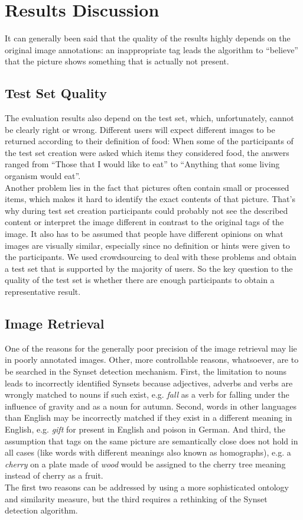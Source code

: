 %
\section{Results Discussion}
\label{sec_discussion}

It can generally been said that the quality of the results highly depends on the original image annotations: an inappropriate tag leads the algorithm to ``believe'' that the picture shows something that is actually not present.

\subsection{Test Set Quality}
The evaluation results also depend on the test set, which, unfortunately, cannot be clearly right or wrong. Different users will expect different images to be returned according to their definition of food: When some of the participants of the test set creation were asked which items they considered food, the answers ranged from ``Those that I would like to eat'' to ``Anything that some living organism would eat''. \\
Another problem lies in the fact that pictures often contain small or processed items, which makes it hard to identify the exact contents of that picture. That's why during test set creation participants could probably not see the described content or interpret the image different in contrast to the original tags of the image. 
It also has to be assumed that people have different opinions on what images are visually similar, especially since no definition or hints were given to the participants. We used crowdsourcing to deal with these problems and obtain a test set that is supported by the majority of users. So the key question to the quality of the test set is whether there are enough participants to obtain a representative result.

\subsection{Image Retrieval}
One of the reasons for the generally poor precision of the image retrieval may lie in poorly annotated images.
Other, more controllable reasons, whatsoever, are to be searched in the Synset detection mechanism.
First, the limitation to nouns leads to incorrectly identified Synsets because adjectives, adverbs and verbs are wrongly matched to nouns if such exist, e.g. \emph{fall} as a verb for falling under the influence of gravity and as a noun for autumn. 
Second, words in other languages than English may be incorrectly matched if they exist in a different meaning in English, e.g. \emph{gift} for present in English and poison in German.
And third, the assumption that tags on the same picture are semantically close does not hold in all cases (like words with different meanings also known as homographs), e.g. a \emph{cherry} on a plate made of \emph{wood} would be assigned to the cherry tree meaning instead of cherry as a fruit. \\
The first two reasons can be addressed by using a more sophisticated ontology and similarity measure, but the third requires a rethinking of the Synset detection algorithm.


